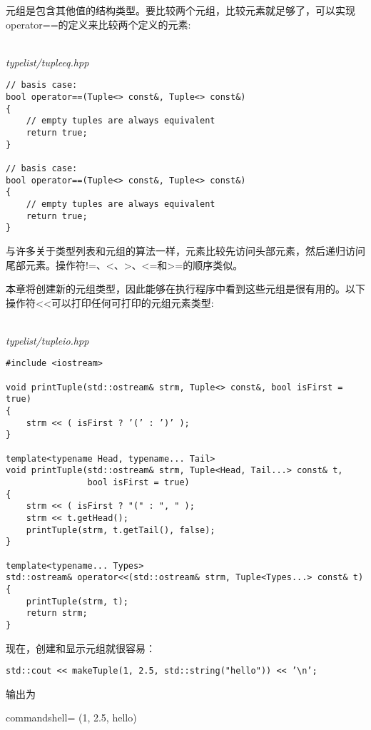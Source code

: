 



元组是包含其他值的结构类型。要比较两个元组，比较元素就足够了，可以实现operator==的定义来比较两个定义的元素:

\hspace*{\fill} \\ %
\noindent
\textit{typelist/tupleeq.hpp}
\begin{lstlisting}[style=styleCXX]
// basis case:
bool operator==(Tuple<> const&, Tuple<> const&)
{
	// empty tuples are always equivalent
	return true;
}

// basis case:
bool operator==(Tuple<> const&, Tuple<> const&)
{
	// empty tuples are always equivalent
	return true;
}
\end{lstlisting}

与许多关于类型列表和元组的算法一样，元素比较先访问头部元素，然后递归访问尾部元素。操作符!=、<、>、<=和>=的顺序类似。


本章将创建新的元组类型，因此能够在执行程序中看到这些元组是很有用的。以下操作符<{}<可以打印任何可打印的元组元素类型:

\hspace*{\fill} \\ %
\noindent
\textit{typelist/tupleio.hpp}
\begin{lstlisting}[style=styleCXX]
#include <iostream>

void printTuple(std::ostream& strm, Tuple<> const&, bool isFirst = true)
{
	strm << ( isFirst ? ’(’ : ’)’ );
}

template<typename Head, typename... Tail>
void printTuple(std::ostream& strm, Tuple<Head, Tail...> const& t,
				bool isFirst = true)
{
	strm << ( isFirst ? "(" : ", " );
	strm << t.getHead();
	printTuple(strm, t.getTail(), false);
}

template<typename... Types>
std::ostream& operator<<(std::ostream& strm, Tuple<Types...> const& t)
{
	printTuple(strm, t);
	return strm;
}
\end{lstlisting}

现在，创建和显示元组就很容易：

\begin{lstlisting}[style=styleCXX]
std::cout << makeTuple(1, 2.5, std::string("hello")) << ’\n’;
\end{lstlisting}

输出为

\begin{tcblisting}{commandshell={}}
(1, 2.5, hello)
\end{tcblisting}





















